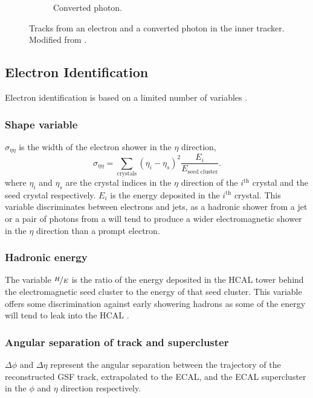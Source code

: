 \begin{figure}[htbp]
\begin{subfigure}{0.49\textwidth}
    \caption{Converted photon.}
    \label{fig:photon_path}
  \end{subfigure}
  \caption[Tracks from an electron and a converted photon in the inner tracker.]
{Tracks from an electron and a converted photon in the inner tracker. Modified
from \cite{barge2009conversion}.}
  \label{fig:conversion}
\end{figure}


\subsection{Electron Identification}
\label{sec:eid}
Electron identification is based on a limited number of variables
\cite{daskalakis2009data,baffioni2009identification}.

\subsubsection{Shape variable}

$\sigma_{\eta\eta}$ is the width of the electron shower in the $\eta$
direction,
\begin{equation}
\sigma_{\eta\eta} = 
\sum_{\text{crystals}} \left(\eta_{i} - \eta_{s}\right)^{2}
\frac{E_{i}}{E_{\text{seed cluster}}}.
\end{equation}
where $\eta_{i}$ and $\eta_{s}$ are the crystal indices in the $\eta$
direction of the $i^{\mathrm{th}}$ crystal and the seed crystal respectively.
$E_i$ is the energy deposited in the $i^{\mathrm{th}}$ crystal.  This variable
discriminates between electrons and jets, as a hadronic shower from a jet or a
pair of photons from a \Ppizero will tend to produce a wider electromagnetic
shower in the $\eta$ direction than a prompt electron.

\subsubsection{Hadronic energy}
The variable $\nicefrac{H}{E}$ is the ratio of the energy deposited in the HCAL
tower behind the electromagnetic seed cluster to the energy of that seed
cluster. This variable offers some discrimination against early showering
hadrons as some of the energy will tend to leak into the HCAL
\cite{baffioni2009identification}.

\subsubsection{Angular separation of track and supercluster}
$\Delta\phi$ and $\Delta\eta$ represent the angular separation between the
trajectory of the reconstructed {GSF} track, extrapolated to the ECAL, and
the ECAL supercluster in the $\phi$ and $\eta$ direction respectively.

